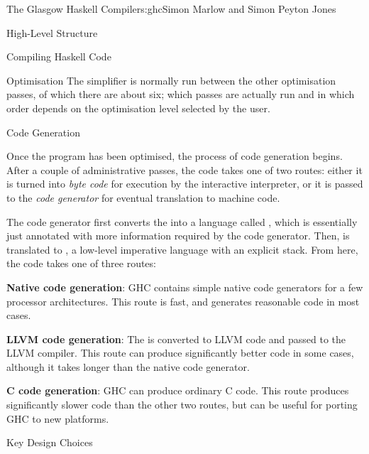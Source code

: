 \begin{aosachapter}{The Glasgow Haskell Compiler}{s:ghc}{Simon Marlow and Simon Peyton Jones}
\begin{aosasect1}{High-Level Structure}
\begin{aosasect2}{Compiling Haskell Code}
\begin{aosasect3}{Optimisation}
The simplifier is normally run between the other optimisation passes,
of which there are about six; which passes are actually run and in
which order depends on the optimisation level selected by the user.

\end{aosasect3}

\begin{aosasect3}{Code Generation}

Once the  program has been optimised, the process of code
generation begins.  After a couple of administrative passes, the code
takes one of two routes: either it is turned into \emph{byte code} for
execution by the interactive interpreter, or it is passed to the
\emph{code generator} for eventual translation to machine code.

The code generator first converts the  into a language called
, which is essentially just  annotated with more
information required by the code generator.  Then,  is translated
to , a low-level imperative language with an explicit stack. From
here, the code takes one of three routes:

\begin{aosaitemize}

\item \textbf{Native code generation}: GHC contains simple native code
  generators for a few processor architectures.  This route is fast,
  and generates reasonable code in most cases.

\item \textbf{LLVM code generation}: The  is converted to
  LLVM code and passed to the LLVM compiler.  This route can produce
  significantly better code in some cases, although it takes longer
  than the native code generator.

\item \textbf{C code generation}: GHC can produce ordinary C code.
  This route produces significantly slower code than the other two
  routes, but can be useful for porting GHC to new platforms.

\end{aosaitemize}

\end{aosasect3}

\end{aosasect2}

\end{aosasect1}

\begin{aosasect1}{Key Design Choices}


\end{aosasect1}
\end{aosachapter}
